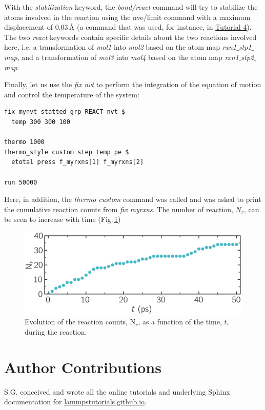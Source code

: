 \documentclass[9pt,tutorial]{livecoms}
\begin{document}
With the \textit{stabilization} keyword, the \textit{bond/react} command will
try to stabilize the atoms involved in the reaction using the nve/limit
command with a maximum displacement of $0.03\,\text{\AA{}}$ (a command that was
used, for instance, in \hyperref[sheared-confined-label]{Tutorial 4}). The two
\textit{react} keywords contain specific details about the two reactions
involved here, i.e. a transformation of \textit{mol1} into \textit{mol2} based
on the atom map \textit{rxn1$\_$stp1$\_$map}, and a transformation of 
\textit{mol3} into \textit{mol4} based on the atom map \textit{rxn1$\_$stp2$\_$map}.

Finally, let us use the \textit{fix nvt} to perform the integration of the 
equation of motion and control the temperature of the system:
{\normalsize
\begin{verbatim}
fix mynvt statted_grp_REACT nvt $
  temp 300 300 100

thermo 1000
thermo_style custom step temp pe $
  etotal press f_myrxns[1] f_myrxns[2]

run 50000
\end{verbatim}
}
Here, in addition, the \textit{thermo custom} command was called and was
asked to print the cumulative reaction counts from \textit{fix myrxns}.
The number of reaction, $N_r$, can be seen to increase with time
(Fig.\,\ref{fig:evolution-reacting})

\begin{figure}
\centering
\includegraphics[width=\linewidth]{REACT-reacting}
\caption{Evolution of the reaction counts, $\text{N}_r$,
as a function of the time, $t$, during the reaction.}
\label{fig:evolution-reacting}
\end{figure}

\section*{Author Contributions}
S.G. conceived and wrote all the online tutorials and underlying Sphinx documentation
for \href{https://lammpstutorials.github.io}{lammpstutorials.github.io}.
\end{document}
